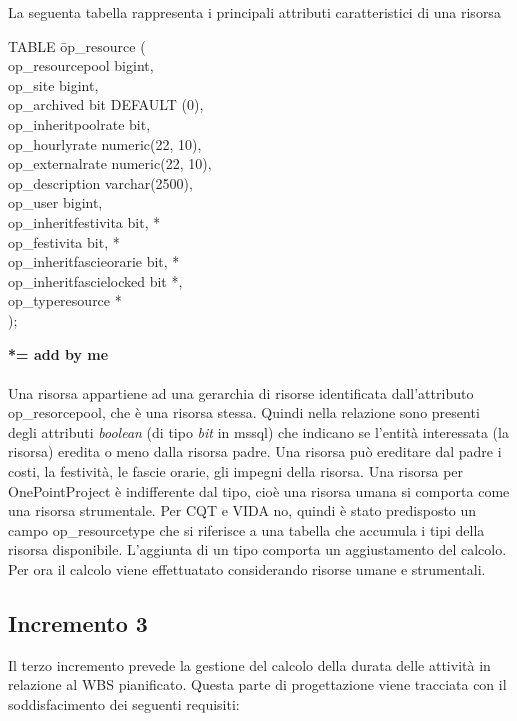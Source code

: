 La seguenta tabella rappresenta i principali attributi caratteristici di una risorsa\\
\begin{tabbing}
TABLE \=op\_resource (\\
\>    op\_resourcepool bigint,\\
\>    op\_site bigint,\\
\>    op\_archived bit DEFAULT (0),\\
\>    op\_inheritpoolrate bit,\\
\>    op\_hourlyrate numeric(22, 10),\\
\>    op\_externalrate numeric(22, 10),\\
\>    op\_description varchar(2500),\\
\>    op\_user bigint,\\
\>    op\_inheritfestivita bit, *\\
\>    op\_festivita bit, *\\
\>    op\_inheritfascieorarie bit, *\\
\>    op\_inheritfascielocked bit *,\\
\>    op\_typeresource *\\
);
\end{tabbing}
\textbf{*= add by me} \\ \\
Una risorsa appartiene ad una gerarchia di risorse identificata dall\textquoteright{}attributo op\_resorcepool, che \`{e} una risorsa stessa. Quindi nella relazione sono presenti degli attributi \textit{boolean} (di tipo \textit{bit} in mssql) che indicano se l\textquoteright{}entit\`{a} interessata (la risorsa) eredita o meno dalla risorsa padre. Una risorsa pu\`{o} ereditare dal padre i costi, la festivit\`{a}, le fascie orarie, gli impegni della risorsa.
Una risorsa per OnePointProject \`{e} indifferente dal tipo, cio\`{e} una risorsa umana si comporta come una risorsa strumentale. Per CQT e VIDA no, quindi \`{e} stato predisposto un campo op\_resourcetype che si riferisce a una tabella che accumula i tipi della risorsa disponibile.
L\textquoteright{}aggiunta di un tipo comporta un aggiustamento del calcolo. Per ora il calcolo viene effettuatato considerando risorse umane e strumentali.

\subsection{Incremento 3}
Il terzo incremento prevede la gestione del calcolo della durata delle attivit\`{a} in relazione al WBS pianificato. Questa parte di progettazione viene tracciata con il soddisfacimento dei seguenti requisiti:

